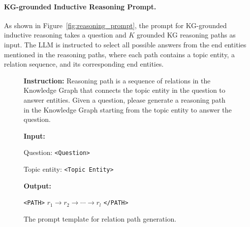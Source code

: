 \documentclass{article}
\begin{document}
\paragraph{KG-grounded Inductive Reasoning Prompt.}
As shown in Figure~\ref{fig:reasoning_prompt}, the prompt for KG-grounded inductive reasoning takes a question and $K$ grounded KG reasoning paths as input. The LLM is instructed to select all possible answers from the end entities mentioned in the reasoning paths, where each path contains a topic entity, a relation sequence, and its corresponding end entities.


\begin{figure}[h]
    \centering
    \begin{tcolorbox}[
        colback=gray!5,
        colframe=black!70,
        colbacktitle=black!70,
        coltitle=white,
        title=Relation Path Generation Prompt,
        fonttitle=\bfseries,
        arc=2pt,
        boxrule=0.7pt,
        left=10pt,
        right=10pt,
        top=6pt,
        bottom=6pt,
        titlerule=0pt,
        width=0.95\linewidth
    ]
    \textbf{Instruction:} Reasoning path is a sequence of relations in the Knowledge Graph that connects the topic entity in the question to answer entities. Given a question, please generate a reasoning path in the Knowledge Graph starting from the topic entity to answer the question.

    \vspace{0.5em}

    \textbf{Input:}

    Question: \texttt{<Question>}

    Topic entity: \texttt{<Topic Entity>}

    \vspace{1em}

    \textbf{Output:}

    \texttt{<PATH>} $r_1 \rightarrow r_2 \rightarrow \cdots \rightarrow r_l$ \texttt{</PATH>}
    \end{tcolorbox}

    \caption{The prompt template for relation path generation.}
    \label{fig:path_gen_prompt}
\end{figure}
\end{document}
